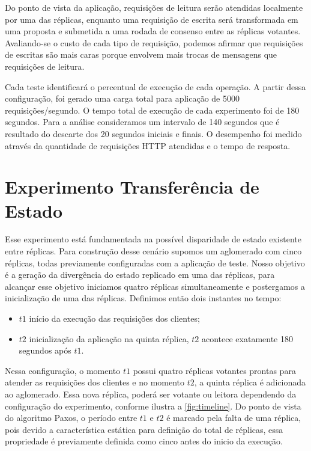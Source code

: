 Do ponto de vista da aplicação, requisições de leitura serão atendidas localmente por uma
das réplicas, enquanto uma requisição de escrita será transformada em uma proposta e
submetida a uma rodada de consenso entre as réplicas votantes. Avaliando-se o custo de
cada tipo de requisição, podemos afirmar que requisições de escritas são mais caras porque
envolvem mais trocas de mensagens que requisições de leitura.

Cada teste identificará o percentual de execução de cada operação. A partir dessa
configuração, foi gerado uma carga total para aplicação de 5000 requisições/segundo. O
tempo total de execução de cada experimento foi de 180 segundos. Para a análise
consideramos um intervalo de 140 segundos que é resultado do descarte dos 20 segundos
iniciais e finais. O desempenho foi medido através da quantidade de requisições HTTP
atendidas e o tempo de resposta.


\section{Experimento Transferência de Estado}\label{sec:experimento_tranferencia_estado}

Esse experimento está fundamentada na possível disparidade de estado existente entre
réplicas. Para construção desse cenário supomos um aglomerado com cinco réplicas, todas
previamente configuradas com a aplicação de teste. Nosso objetivo é a geração da
divergência do estado replicado em uma das réplicas, para alcançar esse objetivo iniciamos
quatro réplicas simultaneamente e postergamos a inicialização de uma das réplicas.
Definimos então dois instantes no tempo:

\begin{itemize}
  \item $t1$ início da execução das requisições dos clientes;
  \item $t2$ inicialização da aplicação na quinta réplica, $t2$ acontece exatamente 180
    segundos após $t1$.
\end{itemize}

Nessa configuração, o momento $t1$ possui quatro réplicas votantes prontas para atender as
requisições dos clientes e no momento $t2$, a quinta réplica é adicionada ao aglomerado.
Essa nova réplica, poderá ser votante ou leitora dependendo da configuração do
experimento, conforme ilustra a \autoref{fig:timeline}. Do ponto de vista do algoritmo
Paxos, o período entre $t1$ e $t2$ é marcado pela falta de uma réplica, pois devido a
característica estática para definição do total de réplicas, essa propriedade é
previamente definida como cinco antes do inicio da execução.

